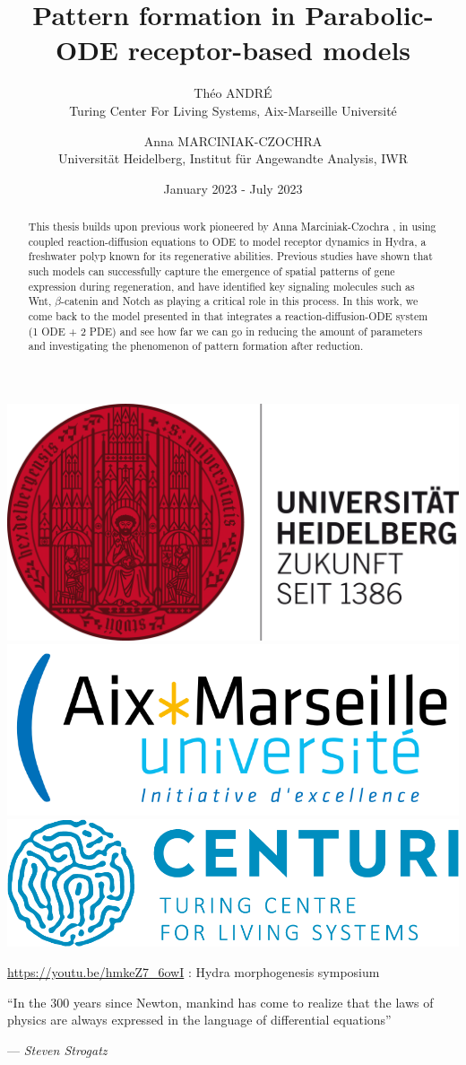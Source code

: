 \documentclass[12pt]{article}
\title{\textbf{Pattern formation in  Parabolic-ODE receptor-based models}}
\author{Théo ANDRÉ \\ Turing Center For Living Systems,  Aix-Marseille Université \and Anna MARCINIAK-CZOCHRA \\ Universität Heidelberg, Institut für Angewandte Analysis, IWR}
\date{January 2023 - July 2023}
\begin{document}
\maketitle



\vspace{1.5cm}
\begin{abstract}
This thesis builds upon previous work pioneered by Anna Marciniak-Czochra \cite{AnnaThesis}, in using coupled reaction-diffusion equations to ODE to model receptor dynamics in Hydra, a freshwater polyp known for its regenerative abilities. Previous studies have shown that such models can successfully capture the emergence of spatial patterns of gene expression during regeneration, and have identified key signaling molecules such as Wnt, $\beta$-catenin and Notch as playing a critical role in this process. In this work, we come back to the model presented in \cite{AnnaThesis} that integrates a  reaction-diffusion-ODE system (1 ODE + 2 PDE) and see how far we can go in reducing the amount of parameters and investigating the phenomenon of pattern formation after reduction.
\end{abstract}

\vfill

\centering
\includegraphics[width=0.23\linewidth]{figures/uni_heidelberg_logo.png}
\hfill
\includegraphics[width=0.3\linewidth]{figures/AMULOGO.png}
\hfill
\includegraphics[width=0.32\linewidth]{figures/centurilogo.png}

\justifying


\newpage

\tableofcontents
\bigskip\bigskip

\url{https://youtu.be/hmkeZ7_6owI} : Hydra morphogenesis symposium


\newpage



		\epigraph{``In the 300 years since Newton, mankind has come to realize that the laws of physics are always expressed in the language of differential equations''}{--- \textit{Steven Strogatz}}



%





%

%

\newpage

\appendix



\nocite{*}
\printbibliography
\end{document}
